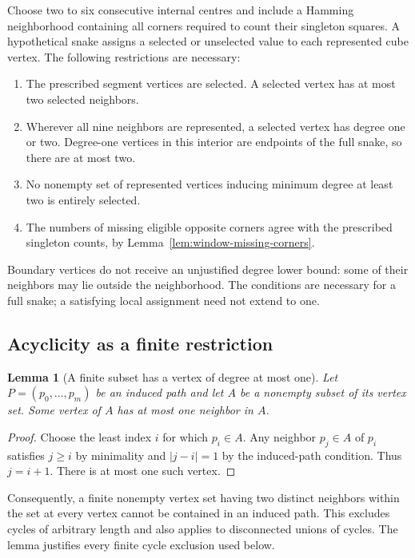 \documentclass[11pt,a4paper]{article}
\newtheorem{lemma}[theorem]{Lemma}
\theoremstyle{definition}
\theoremstyle{remark}
\begin{document}
Choose two to six consecutive internal centres and include a Hamming neighborhood containing all corners required to count their singleton squares. A hypothetical snake assigns a selected or unselected value to each represented cube vertex. The following restrictions are necessary:
\begin{enumerate}
\item The prescribed segment vertices are selected. A selected vertex has at most two selected neighbors.
\item Wherever all nine neighbors are represented, a selected vertex has degree one or two. Degree-one vertices in this interior are endpoints of the full snake, so there are at most two.
\item No nonempty set of represented vertices inducing minimum degree at least two is entirely selected.
\item The numbers of missing eligible opposite corners agree with the prescribed singleton counts, by Lemma~\ref{lem:window-missing-corners}.
\end{enumerate}
Boundary vertices do not receive an unjustified degree lower bound: some of their neighbors may lie outside the neighborhood. The conditions are necessary for a full snake; a satisfying local assignment need not extend to one.

\subsection{Acyclicity as a finite restriction}
\begin{lemma}[A finite subset has a vertex of degree at most one]\label{lem:subset-low-degree}
Let $P=(p_0,\ldots,p_m)$ be an induced path and let $A$ be a nonempty subset of its vertex set. Some vertex of $A$ has at most one neighbor in $A$.
\end{lemma}
\begin{proof}
Choose the least index $i$ for which $p_i\in A$. Any neighbor $p_j\in A$ of $p_i$ satisfies $j\ge i$ by minimality and $|j-i|=1$ by the induced-path condition. Thus $j=i+1$. There is at most one such vertex.
\end{proof}
Consequently, a finite nonempty vertex set having two distinct neighbors within the set at every vertex cannot be contained in an induced path. This excludes cycles of arbitrary length and also applies to disconnected unions of cycles. The lemma justifies every finite cycle exclusion used below.
\end{document}
